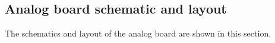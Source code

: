 \newpage
\begin{hugepage}
\section{Analog board schematic and layout}
\label{app:analog_board}
The schematics and layout of the analog board are shown in this section.\\

\pdfpagewidth
\begin{figure}
\centering


\end{figure}
\end{hugepage}
\newpage